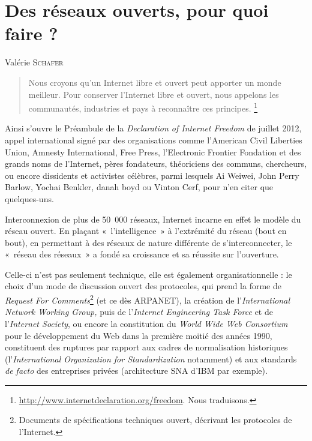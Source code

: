 \documentclass{FramateX}
\begin{document}
\chapter*{Des réseaux ouverts, pour quoi faire ?}
{}

\begin{refsection}

\begin{flushright}
Valérie \textsc{Schafer}
\end{flushright}
\vspace{10 mm}



\begin{quote}
Nous croyons qu'un Internet libre et ouvert peut
apporter un monde meilleur. Pour conserver l'Internet
libre et ouvert, nous appelons les communautés, industries et pays à reconnaître ces principes.
\footnote{\url{http://www.internetdeclaration.org/freedom}. Nous traduisons.}
\end{quote}


Ainsi s'ouvre le Préambule de la \textit{Declaration of
Internet Freedom} de juillet 2012, appel international signé par des
organisations comme l'American Civil Liberties Union,
Amnesty International, Free Press, l'Electronic
Frontier Fondation et des grands noms de l'Internet,
pères fondateurs, théoriciens des communs, chercheurs, ou encore
dissidents et activistes célèbres, parmi lesquels Ai Weiwei, John Perry
Barlow, Yochai Benkler, danah boyd ou Vinton Cerf, pour
n'en citer que quelques-uns. 

Interconnexion de plus de 50~000 réseaux, Internet incarne en effet le
modèle du réseau ouvert. En plaçant «~l'intelligence~»
à l'extrémité du réseau (bout en bout), en permettant
à des réseaux de nature différente de
s'interconnecter, le «~réseau des réseaux~» a fondé sa
croissance et sa réussite sur l'ouverture. 

Celle-ci n'est pas seulement technique, elle est
également organisationnelle : le choix d'un mode de
discussion ouvert des protocoles, qui prend la forme de \textit{Request
For Comments}\footnote{Documents de spécifications techniques ouvert,
décrivant les protocoles de l'Internet.} (et ce dès ARPANET), la création de
l'\textit{International Network Working Group,} puis
de l'\textit{Internet Engineering Task Force }et de
l'\textit{Internet Society}, ou encore la constitution
du \textit{World Wide Web Consortium} pour le développement du Web dans
la première moitié des années 1990, constituent des ruptures par
rapport aux cadres de normalisation historiques
(l'\textit{International Organization for
Standardization} notamment) et aux standards \textit{de facto}
des entreprises privées (architecture SNA d'IBM par
exemple). 


\end{refsection}
\end{document}
